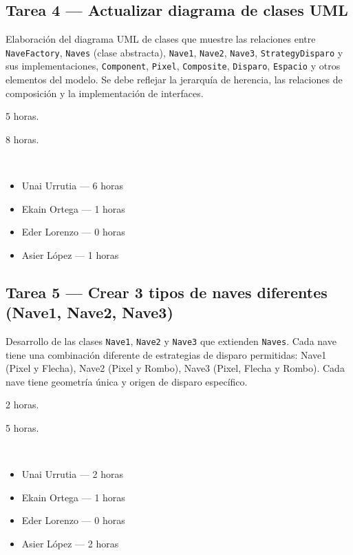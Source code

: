 \documentclass[12pt, a4paper]{article}
\begin{document}
\subsection*{Tarea 4 — Actualizar diagrama de clases UML}
\begin{description}[leftmargin=2em, style=nextline]
    \item[\textbf{Descripción:}] Elaboración del diagrama UML de clases que muestre las relaciones entre \texttt{NaveFactory}, \texttt{Naves} (clase abstracta), \texttt{Nave1}, \texttt{Nave2}, \texttt{Nave3}, \texttt{StrategyDisparo} y sus implementaciones, \texttt{Component}, \texttt{Pixel}, \texttt{Composite}, \texttt{Disparo}, \texttt{Espacio} y otros elementos del modelo. Se debe reflejar la jerarquía de herencia, las relaciones de composición y la implementación de interfaces.
    \item[\textbf{Tiempo estimado:}] 5 horas.
    \item[\textbf{Tiempo real:}] 8 horas.
    \item[\textbf{Responsables y dedicación:}]~
        \begin{itemize}[leftmargin=1em, nosep]
            \item Unai Urrutia — 6 horas
            \item Ekain Ortega — 1 horas
            \item Eder Lorenzo — 0 horas
            \item Asier López — 1 horas
        \end{itemize}
\end{description}

\vspace{0.8em}

\subsection*{Tarea 5 — Crear 3 tipos de naves diferentes (Nave1, Nave2, Nave3)}
\begin{description}[leftmargin=2em, style=nextline]
    \item[\textbf{Descripción:}] Desarrollo de las clases \texttt{Nave1}, \texttt{Nave2} y \texttt{Nave3} que extienden \texttt{Naves}. Cada nave tiene una combinación diferente de estrategias de disparo permitidas: Nave1 (Pixel y Flecha), Nave2 (Pixel y Rombo), Nave3 (Pixel, Flecha y Rombo). Cada nave tiene geometría única y origen de disparo específico.
    \item[\textbf{Tiempo estimado:}] 2 horas.
    \item[\textbf{Tiempo real:}] 5 horas.
    \item[\textbf{Responsables y dedicación:}]~
        \begin{itemize}[leftmargin=1em, nosep]
            \item Unai Urrutia — 2 horas
            \item Ekain Ortega — 1 horas
            \item Eder Lorenzo — 0 horas
            \item Asier López — 2 horas
        \end{itemize}
\end{description}
\end{document}
